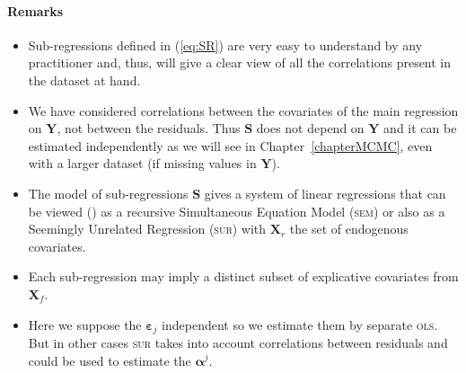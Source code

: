 \documentclass[12pt,a4paper]{report}
\begin{document}
\paragraph{Remarks}
\begin{itemize}
\item Sub-regressions defined in (\ref{eq:SR}) are very easy to understand by any practitioner and, thus, will give a clear view of all the correlations present in the dataset at hand.
\item We have considered correlations between the covariates of the main regression on $\boldsymbol{Y}$, not between the residuals. Thus $\boldsymbol{S}$ does not depend on $\boldsymbol{Y}$ and it can be estimated independently as we will see in Chapter~\ref{chapterMCMC}, even with a larger dataset (if missing values in $\boldsymbol{Y}$).
\item The model of sub-regressions $\boldsymbol{S}$ gives a system of linear regressions that can be viewed (\cite{davidson1993estimation,TIMM}) as a recursive Simultaneous Equation Model (\textsc{sem}) or also as a Seemingly Unrelated Regression (\textsc{sur}) \cite{SURzellner} with $\boldsymbol{X}_r$ the set of endogenous covariates.
\item Each sub-regression may imply a distinct subset of explicative covariates from $\boldsymbol{X}_f$.
\item Here we suppose the $\boldsymbol{\varepsilon}_j$ independent so we estimate them by separate \textsc{ols}. But in other cases \textsc{sur} takes into account correlations between residuals and could be used to estimate the $\boldsymbol{\alpha}^j$. 
\end{itemize} 
\end{document}
